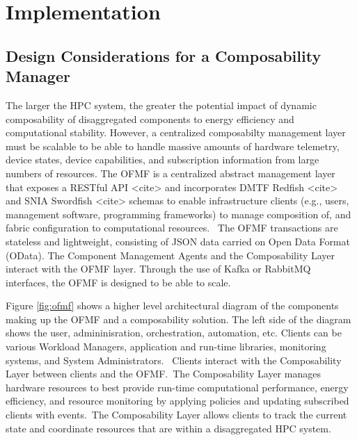 \section{Implementation}

\subsection{Design Considerations for a Composability Manager}

The larger the HPC system, the greater the potential impact of dynamic composability of disaggregated components to energy efficiency and computational stability.  However, a centralized composabilty management layer must be scalable to be able to handle massive amounts of hardware telemetry, device states, device capabilities, and subscription information from large numbers of resources.  The OFMF is a centralized abstract management layer that exposes a RESTful API <cite> and incorporates DMTF Redfish <cite> and SNIA Swordfish <cite> schemas to enable infrastructure clients (e.g., users, management software, programming frameworks) to manage composition of, and fabric configuration to computational resources.  The OFMF transactions are stateless and lightweight, consisting of JSON data carried on Open Data Format (OData).  The Component Management Agents and the Composability Layer interact with the OFMF layer.  Through the use of Kafka \cite{kafka} or RabbitMQ \cite{rabbitmq} interfaces, the OFMF is designed to be able to scale.

Figure \ref{fig:ofmf} shows a higher level architectural diagram of the components making up the OFMF and a composability solution.  The left side of the diagram shows the user, admininisration, orchestration, automation, etc. Clients can be various Workload Managers, application and run-time libraries, monitoring systems, and System Administrators.  Clients interact with the Composability Layer between clients and the OFMF. The Composability Layer manages hardware resources to best provide run-time computational performance, energy efficiency, and resource monitoring by applying policies and updating subscribed clients with events. The Composability Layer allows clients to track the current state and coordinate resources that are within a disaggregated HPC system.

